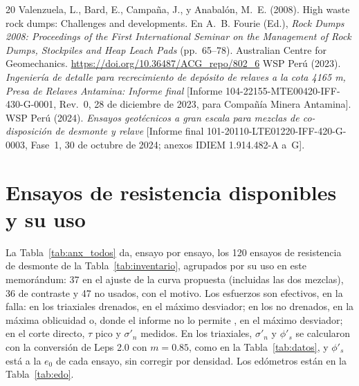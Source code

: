 \documentclass[11pt,letterpaper]{article}
\begin{document}
\begin{thebibliography}{20}
 Valenzuela, L., Bard, E., Campaña, J., y Anabalón, M.~E. (2008). High waste rock dumps: Challenges and developments. En A.~B. Fourie (Ed.), \emph{Rock Dumps 2008: Proceedings of the First International Seminar on the Management of Rock Dumps, Stockpiles and Heap Leach Pads} (pp.~65--78). Australian Centre for Geomechanics. \url{https://doi.org/10.36487/ACG_repo/802_6}
 WSP Perú (2023). \emph{Ingeniería de detalle para recrecimiento de depósito de relaves a la cota 4165 m, Presa de Relaves Antamina: Informe final} [Informe 104-22155-MTE00420-IFF-430-G-0001, Rev.~0, 28 de diciembre de 2023, para Compañía Minera Antamina].
 WSP Perú (2024). \emph{Ensayos geotécnicos a gran escala para mezclas de co-disposición de desmonte y relave} [Informe final 101-20110-LTE01220-IFF-420-G-0003, Fase~1, 30 de octubre de 2024; anexos IDIEM 1.914.482-A a~G].
\end{thebibliography}

\clearpage
\appendix
\renewcommand{\thetable}{A\arabic{table}}\setcounter{table}{0}
\section{Ensayos de resistencia disponibles y su uso}\label{sec:anexo}
La Tabla~\ref{tab:anx_todos} da, ensayo por ensayo, los 120 ensayos de resistencia de desmonte de la Tabla~\ref{tab:inventario}, agrupados por su uso en este memorándum: 37 en el ajuste de la curva propuesta (incluidas las dos mezclas), 36 de contraste y 47 no usados, con el motivo. Los esfuerzos son efectivos, en la falla: en los triaxiales drenados, en el máximo desviador; en los no drenados, en la máxima oblicuidad o, donde el informe no lo permite \citep{g2010}, en el máximo desviador; en el corte directo, $\tau$ pico y $\sigma'_n$ medidos. En los triaxiales, $\sigma'_n$ y $\phi'_s$ se calcularon con la conversión de Leps 2.0 con $m = 0.85$, como en la Tabla~\ref{tab:datos}, y $\phi'_s$ está a la $e_0$ de cada ensayo, sin corregir por densidad. Los edómetros están en la Tabla~\ref{tab:edo}.
\end{document}

